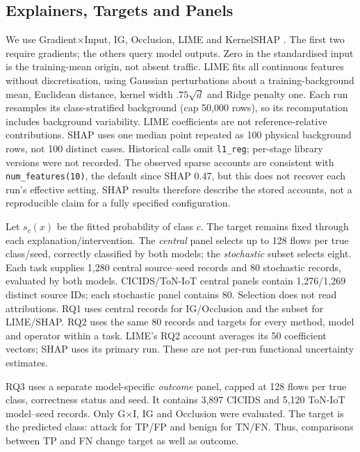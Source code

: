 \subsection{Explainers, Targets and Panels}

We use Gradient$\times$Input, IG, Occlusion, LIME and KernelSHAP
\cite{sundararajan2017axiomatic,zeiler2014visualizing,ribeiro2016why,lundberg2017unified}.
The first two require gradients; the others query model outputs. Zero in the
standardised input is the training-mean origin, not absent traffic. LIME fits
all continuous features without discretisation, using Gaussian perturbations
about a training-background mean, Euclidean distance, kernel width $.75\sqrt d$
and Ridge penalty one. Each run resamples its class-stratified background
(cap 50,000 rows), so its recomputation includes background variability.
LIME coefficients are not reference-relative contributions. SHAP uses one
median point repeated as 100 physical background rows, not 100 distinct cases.
Historical calls omit \texttt{l1\_reg}; per-stage library versions were not
recorded. The observed sparse accounts are consistent with
\texttt{num\_features(10)}, the default since SHAP 0.47, but this does not
recover each run's effective setting. SHAP results therefore describe the
stored accounts, not a reproducible claim for a fully specified configuration.

Let $s_c(x)$ be the fitted probability of class $c$. The target remains fixed
through each explanation/intervention. The \emph{central} panel selects up to
128 flows per true class/seed, correctly classified by both models; the
\emph{stochastic} subset selects eight. Each task supplies 1,280 central
source--seed records and 80 stochastic records, evaluated by both models.
CICIDS/ToN-IoT central panels contain 1,276/1,269 distinct source IDs;
each stochastic panel contains 80. Selection does not read attributions.
RQ1 uses central records for IG/Occlusion and the subset for LIME/SHAP.
RQ2 uses the same 80 records and targets for every method, model and operator
within a task. LIME's RQ2 account averages its 50 coefficient vectors;
SHAP uses its primary run. These are not per-run functional uncertainty estimates.

RQ3 uses a separate model-specific \emph{outcome} panel, capped at 128 flows per
true class, correctness status and seed. It contains 3,897 CICIDS and 5,120
ToN-IoT model--seed records. Only G$\times$I, IG and Occlusion were evaluated.
The target is the predicted class: attack for TP/FP and benign for TN/FN.
Thus, comparisons between TP and FN change target as well as outcome.

